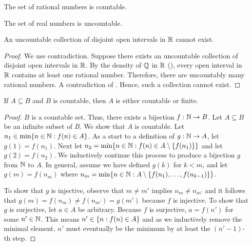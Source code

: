 \documentclass[11pt,twoside=off,numbers=noenddot]{scrbook}
\begin{document}
\begin{corollary}[$\QQ$ is countable]
    The set of rational numbers is countable.
\end{corollary}

\begin{corollary}[$\RR$ is uncountable]
    The set of real numbers is uncountable.
\end{corollary}

\begin{theorem}
    An uncountable collection of disjoint open intervals in $\RR$ cannot exist.
\end{theorem}

\begin{proof}
    We use contradiction. Suppose there exists an uncountable collection of disjoint open intervals in $\RR$. By the density of $\QQ$ in $\RR$ (), every open interval in $\RR$ contains at least one rational number. Therefore, there are uncountably many rational numbers. A contradiction of . Hence, such a collection cannot exist.
\end{proof}

\begin{theorem}
    If $A \subseteq B$ and $B$ is countable, then $A$ is either countable or finite.
\end{theorem}

\begin{proof}
    $B$ is a countable set. Thus, there exists a bijection $f : \mathbb N \to B$. Let $A \subseteq B$ be an infinite subset of $B$. We show that $A$ is countable. Let $n_1 \in \min\{ n \in \mathbb N : f(n) \in A \}$. As a start to a definition of $g : \mathbb N \to A$, let $g(1) = f(n_1)$. Next let $n_2 = \min\{ n \in \mathbb N : f(n) \in A \setminus \{ f(n_1) \} \}$ and let $g(2) = f(n_2)$. We inductively continue this process to produce a bijection $g$ from $\mathbb N$ to $A$. In general, assume we have defined $g(k)$ for $k < m$, and let $g(m) = f(n_m)$ where $n_m = \min\{ n \in \mathbb N : A \setminus \{ f(n_1), \dots, f(n_{k - 1}) \} \}$.

    To show that $g$ is injective, observe that $m \neq m'$ implies $n_m \neq n_{m'}$ and it follows that $g(m) = f(n_m) \neq f(n_{m'}) = g(m')$ because $f$ is injective. To show that $g$ is surjective, let $a \in A$ be arbitrary. Because $f$ is surjective, $a = f(n')$ for some $n' \in \mathbb N$. This means $n' \in \{ n : f(n) \in A \}$ and as we inductively remove the minimal element, $n'$ must eventually be the minimum by at least the $(n' -1)$-th step.
\end{proof}
\end{document}

